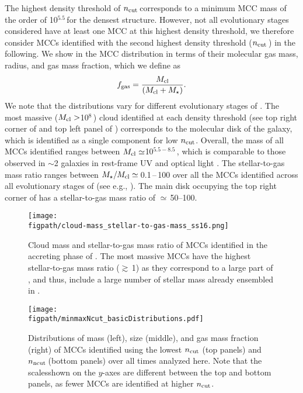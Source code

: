 \IfFileExists{emulateapjlegacy.cls}{\documentclass[iop]{emulateapjlegacy}}{\documentclass[iop]{emulateapj}}
\def\figpath{./Fig}
\begin{document}
The highest density threshold of $n_{\rm cut}$\,\cc corresponds to 
a minimum MCC mass of the order of 10$^{5.5}$\,\Msun for the densest structure.
However, not all evolutionary stages considered have at least one MCC at this highest density threshold, 
we therefore consider MCCs identified with the second highest density threshold ($n_{\rm cut}$\,\cc) in the following. 
We show in  the MCC distribution in terms of their molecular gas mass, radius, and gas mass fraction, which we define as
\begin{equation}
f_{\rm gas} = \frac{M_{\rm cl}} {\left(M_{\rm cl} + M_\star\right)}.
\end{equation}
%
We note that the distributions vary for different evolutionary stages of \flower. 
%
The most massive ($M_{\rm cl}>$10$^8$\,\Msun) 
cloud identified at each density threshold (see top right corner of  and top left panel of )  
corresponds to the molecular disk of the
galaxy, which is identified as a single component for low $n_{\rm
  cut}$. Overall, the mass of all MCCs identified ranges between $M_{\rm
  cl}\simeq$10$^{5.5-8.5}$\,\Msun, which is comparable to those observed in
\z$\sim$2 galaxies in rest-frame UV and optical light
\citep{Elmegreen07a, Elmegreen09a}. 
The stellar-to-gas mass ratio ranges between $M_{\star}/M_{\rm cl} \simeq$\,0.1\,--\,100 over all the
MCCs identified across all evolutionary stages of \flower (see e.g., ). 
The main disk occupying the top right corner of  has a stellar-to-gas mass ratio of $\simeq$\,50--100.


\begin{figure}
\centering
\texttt{[image: \\figpath/cloud-mass\_stellar-to-gas-mass\_ss16.png]}
\caption{Cloud mass and stellar-to-gas mass ratio of MCCs identified in the accreting phase of \flower.
The most massive MCCs have the highest stellar-to-gas mass ratio ($\gtrsim$\,1) as they correspond to a large part of \flower, and thus, 
include a large number of stellar mass already ensembled in \flower. 
\label{fig:stellarRatio16}}
\end{figure}


\begin{figure*}[htbp]
\centering
\texttt{[image: \\figpath/minmaxNcut\_basicDistributions.pdf]}
\caption{Distributions of mass (left), size (middle), and gas mass
  fraction (right) of MCCs identified using the lowest $n_{\rm cut}$
  (top panels) and $n_{\rm ncut}$\,\cc (bottom panels)
 over all times analyzed here.
Note that the scalesshown on the $y$-axes are different between the top
and bottom panels, as fewer MCCs are identified at higher $n_{\rm
  cut}$. 
\label{fig:dist}}
\end{figure*}
\end{document}
